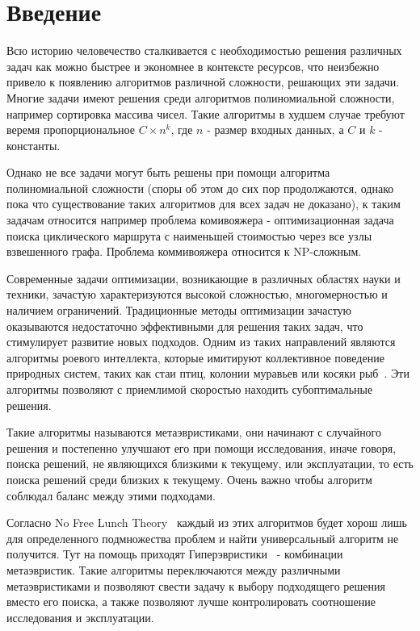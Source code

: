 \documentclass[a4paper,12pt]{extarticle}
\begin{document}
\section{Введение}	

Всю историю человечество сталкивается с необходимостью решения различных задач как можно быстрее и экономнее в контексте ресурсов, что неизбежно привело к появлению алгоритмов различной сложности, решающих эти задачи. Многие задачи имеют решения среди алгоритмов полиномиальной сложности, например сортировка массива чисел. Такие алгоритмы в худшем случае требуют веремя пропорциональное $C \times n^k$, где $n$ - размер входных данных, а $C$ и $k$ - константы.  

Однако не все задачи могут быть решены при помощи алгоритма полиномиальной сложности (споры об этом до сих пор продолжаются, однако пока что существование таких алгоритмов для всех задач не доказано), к таким задачам относится например проблема комивояжера - оптимизационная задача поиска циклического маршрута с наименьшей стоимостью через все узлы взвешенного графа. Проблема коммивояжера относится к NP-сложным.

Современные задачи оптимизации, возникающие в различных областях науки и техники, зачастую характеризуются высокой сложностью, многомерностью и наличием ограничений. Традиционные методы оптимизации зачастую оказываются недостаточно эффективными для решения таких задач, что стимулирует развитие новых подходов. Одним из таких направлений являются алгоритмы роевого интеллекта, которые имитируют коллективное поведение природных систем, таких как стаи птиц, колонии муравьев или косяки рыб~\cite{trivedi_varshney}. Эти алгоритмы позволяют с приемлимой скоростью находить субоптимальные решения.

Такие алгоритмы называются метаэвристиками, они начинают с случайного решения и постепенно улучшают его при помощи исследования, иначе говоря, поиска решений, не являющихся близкими к текущему, или эксплуатации, то есть поиска решений среди близких к текущему. Очень важно чтобы алгоритм соблюдал баланс между этими подходами.

Согласно No Free Lunch Theory~\cite{nofreelunch} каждый из этих алгоритмов будет хорош лишь для определенного подмножества проблем и найти универсальный алгоритм не получится. Тут на помощь приходят Гиперэвристики~\cite{burke_etal_2019} - комбинации метаэвристик. Такие алгоритмы переключаются между различными метаэвристиками и позволяют свести задачу к выбору подходящего решения вместо его поиска, а также позволяют лучше контролировать соотношение исследования и эксплуатации.
\end{document}
